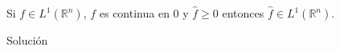 \begin{homeworkProblem}
  Si $f\in L^1(\mathbb{R}^{n})$, $f$ es continua en $0$ y $\hat{f}\geq 0$ entonces $\hat{f}\in L^{1}(\mathbb{R}^{n})$. 
  \begin{solution}
    Solución
  \end{solution}
\end{homeworkProblem}
